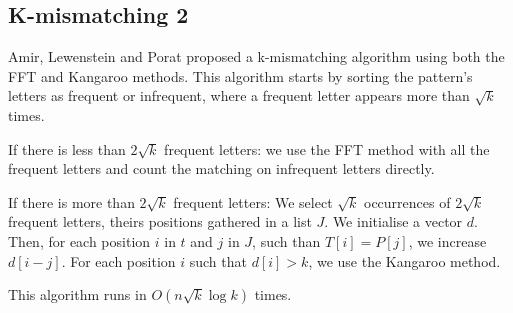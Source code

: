 \documentclass[preprint,12pt]{elsarticle}
\begin{document}



\subsection{K-mismatching 2}
Amir, Lewenstein and Porat\cite{Kmism2} proposed a k-mismatching algorithm
using both the FFT and Kangaroo methods.
This algorithm starts by sorting the pattern's letters as frequent or infrequent,
where a frequent letter appears more than $\sqrt{k}$ times.

If there is less than $2\sqrt{k}$ frequent letters: 
we use the FFT method with all the frequent letters and count the matching on infrequent letters directly.

If there is more than $2\sqrt{k}$ frequent letters:
We select $\sqrt{k}$ occurrences of $2\sqrt{k}$ frequent letters,
theirs positions gathered in a list $J$.
We initialise a vector $d$.
Then, for each position $i$ in $t$ and $j$ in $J$, such than $T[i] = P[j]$,
we increase $d[i-j]$.
For each position $i$ such that $d[i]>k$, we use the Kangaroo method.

This algorithm runs in $O(n\sqrt{k} \log k)$ times.



\end{document}
